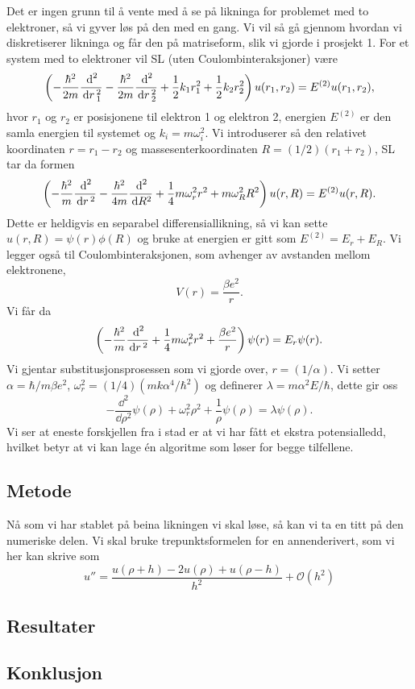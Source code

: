 \documentclass[norsk, 11pt]{article}
\begin{document}
Det er ingen grunn til å vente med å se på likninga for problemet med to elektroner, så vi gyver løs på den med en gang. Vi vil så gå gjennom hvordan vi diskretiserer likninga og får den på matriseform, slik vi gjorde i prosjekt 1. For et system med to elektroner vil SL (uten Coulombinteraksjoner) være
$$ \left( - \frac{ \hbar^2}{2m} \frac{\, {\text d}^2}{\, {\rm d}r\,_1^2} - \frac{ \hbar^2}{2m} \frac{\, {\text d}^2}{\, {\rm d}r\,_2^2} + \frac{1}2 k_1r_1^2 + \frac{1}2 k_2r_2^2 \right) u(r_1,r_2) = E^{(2)}u(r_1,r_2), $$
hvor $r_1$ og $r_2$ er posisjonene til elektron 1 og elektron 2, energien $E^{(2)}$ er den samla energien til systemet og $k_i = m\omega_i^2$. Vi introduserer så den relativet koordinaten $r = r_1 - r_2$ og massesenterkoordinaten $R = (1/2)(r_1 + r_2)$, SL tar da formen
$$ \left( - \frac{ \hbar^2}{m} \frac{\, {\text d}^2}{\, {\rm d}r\,^2} - \frac{ \hbar^2}{4m} \frac{\, {\text d}^2}{\, {\text d} R^2} + \frac{1}4 m\omega_r^2r^2 + m\omega_R^2R^2 \right) u(r,R) = E^{(2)}u(r,R). $$
Dette er heldigvis en separabel differensiallikning, så vi kan sette $u(r,R) = \psi(r)\phi(R)$ og bruke at energien er gitt som $E^{(2)} = E_r + E_R$. Vi legger også til Coulombinteraksjonen, som avhenger av avstanden mellom elektronene,
$$ V(r) = \frac{\beta e^2}r. $$ 
Vi får da
$$ \left( - \frac{ \hbar^2}{m} \frac{\, {\text d}^2}{\, {\rm d}r\,^2} + \frac{1}4 m\omega_r^2r^2 + \frac{\beta e^2}r \right) \psi(r) = E_r\psi(r). $$
Vi gjentar substitusjonsprosessen som vi gjorde over, $r = (1/\alpha)$. Vi setter $\alpha  = \hbar / m\beta e^2$, $\omega_r^2 = (1/4)(mk\alpha^4/\hbar^2)$ og definerer $ \lambda = m \alpha^2 E/\hbar$, dette gir oss
$$ - \frac{\dd^2}{\dd \rho^2} \psi(\rho) + \omega_r^2\rho^2 + \frac{1}\rho  \psi(\rho) = \lambda \psi(\rho). $$
Vi ser at eneste forskjellen fra i stad er at vi har fått et ekstra potensialledd, hvilket betyr at vi kan lage én algoritme som løser for begge tilfellene.

\subsection*{Metode}
Nå som vi har stablet på beina likningen vi skal løse, så kan vi ta en titt på den numeriske delen. Vi skal bruke trepunktsformelen for en annenderivert, som vi her kan skrive som
$$ u'' = \frac{u(\rho + h) - 2u(\rho) + u(\rho - h)}{h^2} + \mathcal{O}(h^2) $$

\subsection*{Resultater}

\subsection*{Konklusjon}
\end{document}
